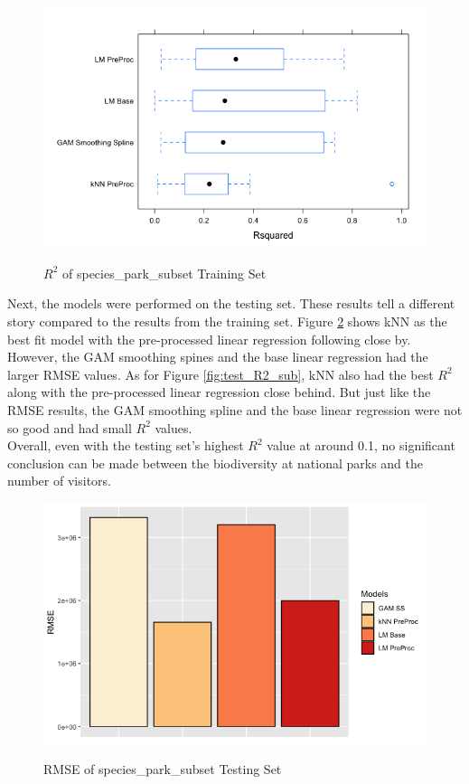 \documentclass[stu, floatsintext, 11pt]{apa7}
\begin{document}
\begin{figure}[h!]
\centering
\caption{$R^2$ of species\_park\_subset Training Set}
\includegraphics[scale=0.6]{images/train_R2_subset.png}
\label{fig:train_R2_sub}
\end{figure}

Next, the models were performed on the testing set. These results tell a different story compared to the results from the training set. Figure \ref{fig:test_RMSE_sub} shows kNN as the best fit model with the pre-processed linear regression following close by. However, the GAM smoothing spines and the base linear regression had the larger RMSE values. As for Figure \ref{fig:test_R2_sub}, kNN also had the best $R^2$ along with the pre-processed linear regression close behind. But just like the RMSE results, the GAM smoothing spline and the base linear regression were not so good and had small $R^2$ values. \\

Overall, even with the testing set's highest $R^2$ value at around 0.1, no significant conclusion can be made between the biodiversity at national parks and the number of visitors.

\begin{figure}[h!]
\centering
\caption{RMSE of species\_park\_subset Testing Set}
\includegraphics[scale=0.6]{images/test_RMSE_subset.png}
\label{fig:test_RMSE_sub}
\end{figure}
\end{document}
